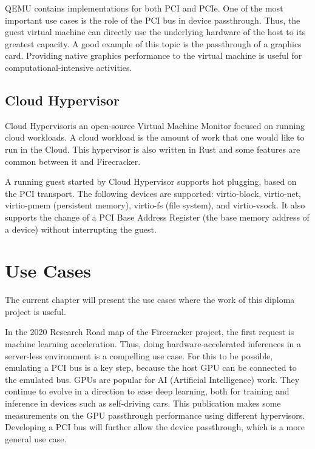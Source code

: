 \documentclass[12pt, a4paper]{report}
\begin{document}
QEMU contains implementations for both PCI and PCIe. One of the most important use cases is the role of the PCI bus in device passthrough. Thus, the guest virtual machine can directly use the underlying hardware of the host to its greatest capacity. A good example of this topic is the passthrough of a graphics card. Providing native graphics performance to the virtual machine is useful for computational-intensive activities.

\section{Cloud Hypervisor}

Cloud Hypervisor\footnotemark is an open-source Virtual Machine Monitor focused on running cloud workloads. A cloud workload is the amount of work that one would like to run in the Cloud. This hypervisor is also written in Rust and some features are common between it and Firecracker.

A running guest started by Cloud Hypervisor supports hot plugging, based on the PCI transport. The following devices are supported: virtio-block, virtio-net, virtio-pmem (persistent memory), virtio-fs (file system), and virtio-vsock. It also supports the change of a PCI Base Address Register (the base memory address of a device) without interrupting the guest.


\chapter{Use Cases}\label{Use Cases}

The current chapter will present the use cases where the work of this diploma project is useful.

In the 2020 Research Road map of the Firecracker project, the first request is machine learning acceleration\footnotemark. Thus, doing hardware-accelerated inferences in a server-less environment is a compelling use case. For this to be possible, emulating a PCI bus is a key step, because the host GPU can be connected to the emulated bus. GPUs are popular for AI (Artificial Intelligence) work. They continue to evolve in a direction to ease deep learning, both for training and inference in devices such as self-driving cars. This publication\cite{gpu_passthrough} makes some measurements on the GPU passthrough performance using different hypervisors. Developing a PCI bus will further allow the device passthrough, which is a more general use case.
\end{document}
